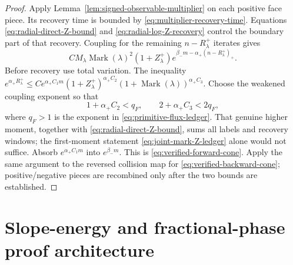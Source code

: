 \documentclass[11pt]{article}
\begin{document}
\begin{proof}
Apply Lemma~\ref{lem:signed-observable-multiplier} on each positive face
piece.  Its recovery time is bounded by
\eqref{eq:multiplier-recovery-time}.  Equations
\eqref{eq:radial-direct-Z-bound} and
\eqref{eq:radial-log-Z-recovery} control the boundary part of that recovery.
Coupling for the remaining
$n-R^+_\lambda$ iterates gives
\[
 CM_\lambda\operatorname{Mark}(\lambda)^2(1+Z_\lambda^+)
 e^{\beta_-m-\alpha_+(n-R^+_\lambda)_+}.
\]
Before recovery use total variation.  The inequality
 $e^{\alpha_+R^+_\lambda}\le
 Ce^{\alpha_+C_1m}(1+Z_\lambda^+)^{\alpha_+C_2}
 (1+\operatorname{Mark}(\lambda))^{\alpha_+C_3}$.
 Choose the weakened coupling exponent so that
\[
 1+\alpha_+C_2<q_F,
 \qquad 2+\alpha_+C_3<2q_F,
\]
where $q_F>1$ is the exponent in
\eqref{eq:primitive-flux-ledger}.  That genuine higher moment, together with
\eqref{eq:radial-direct-Z-bound}, sums all labels and recovery windows; the
first-moment statement \eqref{eq:joint-mark-Z-ledger} alone would not suffice.
Absorb
$e^{\alpha_+C_1m}$ into $e^{\beta_-m}$.  This is
\eqref{eq:verified-forward-cone}.  Apply the same argument to the reversed
collision map for \eqref{eq:verified-backward-cone}; positive/negative pieces
are recombined only after the two bounds are established.
\end{proof}

\section{Slope-energy and fractional-phase proof architecture}
\end{document}
